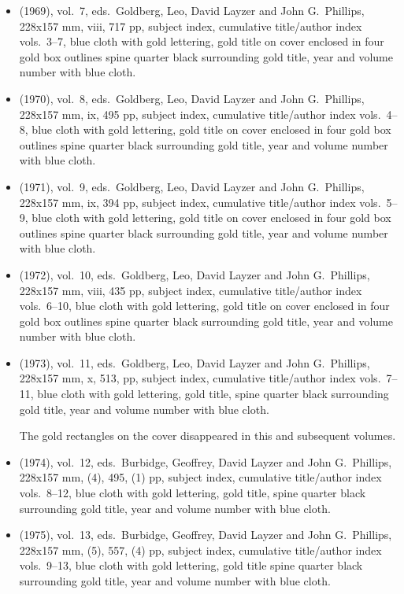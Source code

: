 \begin{itemize}
	\item (1969), vol.\ 7, eds.\ Goldberg, Leo, David Layzer and John G.\ Phillips, 228x157 mm,
	viii, 717 pp, subject index, cumulative title/author index vols.\ 3--7,
	blue cloth with gold lettering, gold title on cover enclosed in four gold box outlines
  spine quarter black surrounding gold title, year and volume number with blue cloth.
	
	\item (1970), vol.\ 8, eds.\ Goldberg, Leo, David Layzer and John G.\ Phillips, 228x157 mm,
	ix, 495 pp, subject index, cumulative title/author index vols.\ 4--8,
	blue cloth with gold lettering, gold title on cover enclosed in four gold box outlines
  spine quarter black surrounding gold title, year and volume number with blue cloth.
	
	\item (1971), vol.\ 9, eds.\ Goldberg, Leo, David Layzer and John G.\ Phillips, 228x157 mm,
	ix, 394 pp, subject index, cumulative title/author index vols.\ 5--9,
	blue cloth with gold lettering, gold title on cover enclosed in four gold box outlines
  spine quarter black surrounding gold title, year and volume number with blue cloth.
	
	\item (1972), vol.\ 10, eds.\ Goldberg, Leo, David Layzer and John G.\ Phillips, 228x157 mm,
	viii, 435 pp, subject index, cumulative title/author index vols.\ 6--10,
	blue cloth with gold lettering, gold title on cover enclosed in four gold box outlines
  spine quarter black surrounding gold title, year and volume number with blue cloth.
	
	\item (1973), vol.\ 11, eds.\ Goldberg, Leo, David Layzer and John G.\ Phillips, 228x157 mm,
	x, 513, pp, subject index, cumulative title/author index vols.\ 7--11,
	blue cloth with gold lettering, gold title,
  spine quarter black surrounding gold title, year and volume number with blue cloth.
  
  The gold rectangles on the cover disappeared in this and subsequent volumes.
	
	\item (1974), vol.\ 12, eds.\ Burbidge, Geoffrey, David Layzer and John G.\ Phillips, 228x157 mm,
	(4), 495, (1) pp, subject index, cumulative title/author index vols.\ 8--12,
	blue cloth with gold lettering, gold title,
  spine quarter black surrounding gold title, year and volume number with blue cloth.
	
	\item (1975), vol.\ 13, eds.\ Burbidge, Geoffrey, David Layzer and John G.\ Phillips, 228x157 mm,
	(5), 557, (4) pp, subject index, cumulative title/author index vols.\ 9--13,
	blue cloth with gold lettering, gold title
  spine quarter black surrounding gold title, year and volume number with blue cloth.
	

\end{itemize}

